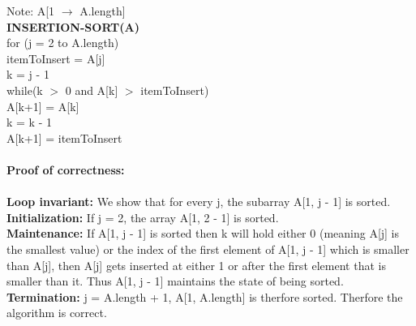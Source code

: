 \documentclass{article}
\begin{document}
\noindent Note: A[1 $\rightarrow$ A.length]\\

\noindent\textbf{INSERTION-SORT(A)}\\
\indent for (j = 2 to A.length)\\
\indent\indent itemToInsert = A[j]\\
\indent\indent k = j - 1\\
\indent\indent while(k $>$ 0 and A[k] $>$ itemToInsert)\\
\indent\indent\indent A[k+1] = A[k]\\
\indent\indent\indent k = k - 1\\
\indent\indent A[k+1] = itemToInsert\\\\

\noindent\textbf{Proof of correctness:}\\\\
\textbf{Loop invariant:} We show that for every j, the subarray A[1, j - 1] is sorted.
\textbf{Initialization:} If j = 2, the array A[1, 2 - 1] is sorted.\\
\textbf{Maintenance:} If A[1, j - 1] is sorted then k will hold either 0 (meaning A[j] is the smallest value) or the index of the first element of A[1, j - 1] which is smaller than A[j], then A[j] gets inserted at either 1 or after the first element that is smaller than it. Thus A[1, j - 1] maintains the state of being sorted.\\
\textbf{Termination:} j = A.length + 1, A[1, A.length] is therfore sorted. Therfore the algorithm is correct.
\end{document}
